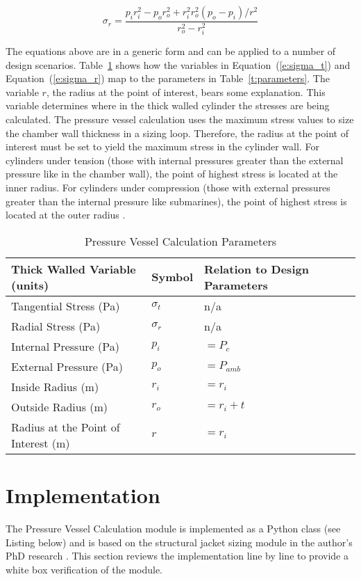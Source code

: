 \documentclass{article}
\begin{document}
\begin{equation}
 \label{e:sigma_r}
  \sigma_r = \frac{p_i r_i^2 - p_o r_o^2 + r_i^2 r_o^2 (p_o - p_i)/r^2}{r_o^2 - r_i^2}
\end{equation}

The equations above are in a generic form and can be applied to a number of design scenarios.  Table~\ref{t:parameter_mapping} shows how the variables in Equation~(\ref{e:sigma_t}) and Equation~(\ref{e:sigma_r}) map to the parameters in Table~\ref{t:parameters}.  The variable $r$, the radius at the point of interest, bears some explanation.  This variable determines where in the thick walled cylinder the stresses are being calculated.  The pressure vessel calculation uses the maximum stress values to size the chamber wall thickness in a sizing loop.  Therefore, the radius at the point of interest must be set to yield the maximum stress in the cylinder wall.  For cylinders under tension (those with internal pressures greater than the external pressure like in the chamber wall), the point of highest stress is located at the inner radius.  For cylinders under compression (those with external pressures greater than the internal pressure like submarines), the point of highest stress is located at the outer radius \cite{Kharagpur2015}. 

\begin{table}[ht!]%
  \caption{Pressure Vessel Calculation Parameters}
  \centering
  \begin{tabular}{llll}
   Thick Walled Variable (units) & Symbol & Relation to Design Parameters \\
	\hline\hline
	Tangential Stress (Pa) & $\sigma_t$ & n/a \\
	Radial Stress (Pa) & $\sigma_r$  & n/a \\
	Internal Pressure (Pa) & $p_i$ & $= P_c$\\
	External Pressure (Pa) & $p_o$ & $= P_{amb}$\\
	Inside Radius (m) & $r_i$ & $= r_i$\\
	Outside Radius (m) & $r_o$ & $= r_i + t$\\
	Radius at the Point of Interest (m) & $r$ & $= r_i$\\
	\hline
  \end{tabular}
 \label{t:parameter_mapping}
\end{table}

\section{Implementation}
The Pressure Vessel Calculation module is implemented as a Python class (see Listing below) and is based on the structural jacket sizing module in the author's PhD research \cite{Simmons2014}.  This section reviews the implementation line by line to provide a white box verification of the module.  
\end{document}
